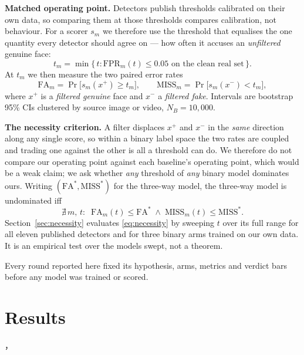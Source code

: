 \documentclass[conference]{IEEEtran}
\begin{document}
\textbf{Matched operating point.} Detectors publish thresholds calibrated on their own data,
so comparing them at those thresholds compares calibration, not behaviour. For a scorer
$s_m$ we therefore use the threshold that equalises the one quantity every detector should
agree on --- how often it accuses an \emph{unfiltered} genuine face:
\begin{equation}
t_m = \min\{\, t : \mathrm{FPR}_m(t) \le 0.05 \text{ on the clean real set} \,\}.
\end{equation}
At $t_m$ we then measure the two paired error rates
\begin{equation}
\mathrm{FA}_m = \Pr\!\big[s_m(x^{+}) \ge t_m\big], \qquad
\mathrm{MISS}_m = \Pr\!\big[s_m(x^{-}) < t_m\big],
\end{equation}
where $x^{+}$ is a \emph{filtered genuine} face and $x^{-}$ a \emph{filtered fake}. Intervals
are bootstrap 95\% CIs clustered by source image or video, $N_B=10{,}000$.

\textbf{The necessity criterion.} A filter displaces $x^{+}$ and $x^{-}$ in the \emph{same}
direction along any single score, so within a binary label space the two rates are coupled and
trading one against the other is all a threshold can do. We therefore do not compare our
operating point against each baseline's operating point, which would be a weak claim; we ask
whether \emph{any} threshold of \emph{any} binary model dominates ours. Writing
$(\mathrm{FA}^\ast, \mathrm{MISS}^\ast)$ for the three-way model, the three-way model is
undominated iff
\begin{equation}
\nexists\, m,\, t: \;\;
\mathrm{FA}_m(t) \le \mathrm{FA}^\ast \;\wedge\; \mathrm{MISS}_m(t) \le \mathrm{MISS}^\ast .
\label{eq:necessity}
\end{equation}
Section~\ref{sec:necessity} evaluates \eqref{eq:necessity} by sweeping $t$ over its full range
for all eleven published detectors and for three binary arms trained on our own data. It is an
empirical test over the models swept, not a theorem.

Every round reported here fixed its hypothesis, arms, metrics and verdict bars before any model
was trained or scored.


\section{Results}，
\end{document}
